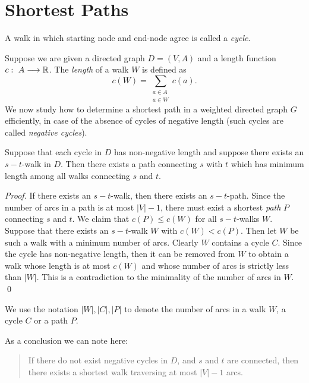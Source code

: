 \section{Shortest Paths}
\label{sec:shortest-paths}

\begin{definition}[Cycle]
  A walk in which starting node and end-node agree is called a
  \emph{cycle}. 
\end{definition}

Suppose we are given a directed graph $D=(V,A)$ and a length function
$c:~A\longrightarrow\mathbb{R}$. The \emph{length} of a walk $W$ is defined as 
\begin{displaymath}
  c(W) = \sum_{\substack{a \in A\\ a\in W}}  c(a). 
\end{displaymath}
%
We now study how to determine a shortest path in a weighted directed
graph
$G$ efficiently, in case of the absence of cycles of negative length (such cycles are called \emph{negative cycles}). 

\begin{theorem}
  \label{f:thr:1}
  Suppose that each cycle in $D$ has non-negative length and suppose
  there exists an $s-t$-walk in $D$. Then there exists a path
  connecting $s$ with $t$ which has minimum length among all walks
  connecting $s$ and $t$. 
\end{theorem}

\begin{proof}
  If there exists an $s-t$-walk, then there exists an $s-t$-path. Since
  the number of arcs in a path is at most $|V| - 1 $, there must exist a
  shortest \emph{path}  $P$  connecting $s$ and $t$. We claim that
  $c(P)\leq c(W)$ for all $s-t$-walks $W$. Suppose that there exists
  an $s-t$-walk $W$ with $c(W)<c(P)$. Then let $W$ be such a walk with
  a minimum number of arcs. Clearly $W$ contains a cycle $C$.  Since the
  cycle has non-negative length, then it can be removed from $W$ to
  obtain a walk whose length is at most $c(W)$ and whose number of
  arcs is strictly less than $|W|$. This is a contradiction to the 
  minimality of the number of arcs in $W$.
  \qed
\end{proof}

We use the notation $|W|,|C|,|P|$ to denote the number of arcs in a
walk $W$, a cycle $C$ or a path $P$. 


As a conclusion we can note here: 
\begin{quote}
  If there do not exist negative cycles in $D$, and $s$ and $t$ are
  connected, then there exists a shortest walk traversing at most 
  $|V|  - 1$ arcs.
\end{quote}


